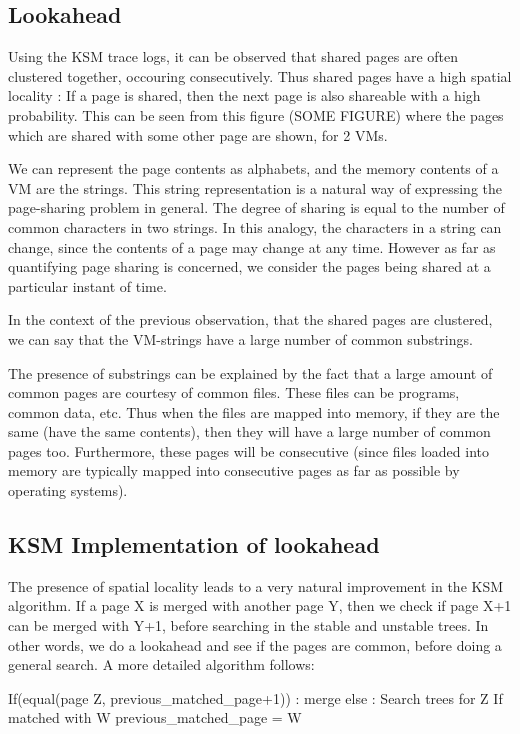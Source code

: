 \documentclass[10pt,a4paper]{article}
\begin{document}
\subsection{Lookahead}
Using the KSM trace logs, it can be observed that shared pages are often clustered together, occouring consecutively. Thus shared pages have a high spatial locality : If a page is shared, then the next page is also shareable with a high probability. 
This can be seen from this figure (SOME FIGURE) where the pages which are shared with some other page are shown, for 2 VMs.

We can represent the page contents as alphabets, and the memory contents of a VM are the strings.
This string representation is a natural way of expressing the page-sharing problem in general. The degree of sharing is equal to the number of common characters in two strings.  In this analogy, the characters in a string can change, since the contents of a page may change at any time. However as far as quantifying page sharing is concerned, we consider the pages being shared at a particular instant of time.

In the context of the previous observation, that the shared pages are clustered, we can say that the VM-strings have a large number of common substrings. 

The presence of substrings can be explained by the fact that a large amount of common pages are courtesy of common files. These files can be programs, common data, etc. Thus when the files are mapped into memory, if they are the same (have the same contents), then they will have a large number of common pages too. Furthermore, these pages will be consecutive (since files loaded into memory are typically mapped into consecutive pages as far as possible by operating systems).

\subsection{KSM Implementation of lookahead}

The presence of spatial locality leads to a very natural improvement in the KSM algorithm. If a page X is merged with another page Y, then we check if page X+1 can be merged with Y+1, before searching in the stable and unstable trees. In other words, we do a lookahead and see if the pages are common, before doing a general search. 
A more detailed algorithm follows:

If(equal(page Z, previous_matched_page+1)) :
     merge
else :
   Search trees for Z 
   If matched with W 
        previous_matched_page = W
\end{document}
